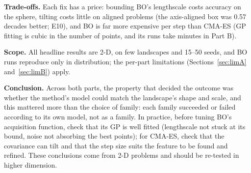 \documentclass[10pt,a4paper]{article}
\begin{document}
\textbf{Trade-offs.} Each fix has a price: bounding BO's lengthscale costs accuracy on the sphere, tilting costs
little on aligned problems (the axis-aligned box was 0.57 decades better; E10), and BO is far more expensive per
step than CMA-ES (GP fitting is cubic in the number of points, and its runs take minutes in Part B).

\textbf{Scope.} All headline results are 2-D, on few landscapes and 15--50 seeds, and BO runs reproduce only in
distribution; the per-part limitations (Sections~\ref{sec:limA} and~\ref{sec:limB}) apply.

\textbf{Conclusion.} Across both parts, the property that decided the outcome was whether the method's model could
match the landscape's shape and scale, and this mattered more than the choice of family: each family succeeded or
failed according to its own model, not as a family. In practice, before tuning BO's acquisition function, check that
its GP is well fitted (lengthscale not stuck at its bound, noise not absorbing the best points); for CMA-ES, check
that the covariance can tilt and that the step size suits the feature to be found and refined. These conclusions
come from 2-D problems and should be re-tested in higher dimension.

\small


\end{document}

